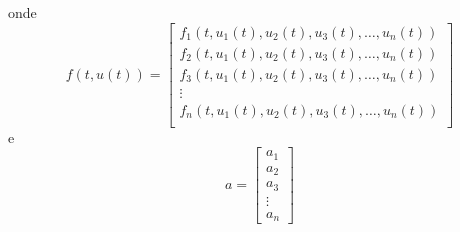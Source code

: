 onde
\begin{equation}f(t,u(t))=\left[
\begin{array}{c}
  f_1(t,u_1(t), u_2(t), u_3(t),\ldots, u_n(t))\\
  f_2(t,u_1(t), u_2(t), u_3(t),\ldots, u_n(t))\\
  f_3(t,u_1(t), u_2(t), u_3(t),\ldots, u_n(t))\\
  \vdots\\
  f_n(t,u_1(t), u_2(t), u_3(t),\ldots, u_n(t))\\
  \end{array}
\right]\end{equation}
e
\begin{equation}a=\left[
\begin{array}{c}
 a_1\\
 a_2\\
 a_3\\
 \vdots\\
 a_n
\end{array}
\right]\end{equation}

